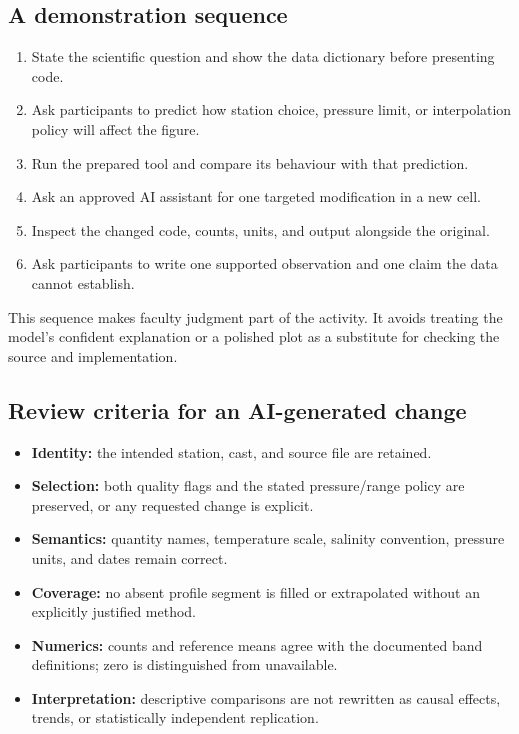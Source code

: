 \documentclass[11pt,letterpaper]{article}
\begin{document}
\subsection{A demonstration sequence}
\begin{enumerate}
  \item State the scientific question and show the data dictionary before presenting code.
  \item Ask participants to predict how station choice, pressure limit, or interpolation policy will affect the figure.
  \item Run the prepared tool and compare its behaviour with that prediction.
  \item Ask an approved AI assistant for one targeted modification in a new cell.
  \item Inspect the changed code, counts, units, and output alongside the original.
  \item Ask participants to write one supported observation and one claim the data cannot establish.
\end{enumerate}
This sequence makes faculty judgment part of the activity. It avoids treating the model's confident explanation or a polished plot as a substitute for checking the source and implementation.

\subsection{Review criteria for an AI-generated change}
\begin{itemize}
  \item \textbf{Identity:} the intended station, cast, and source file are retained.
  \item \textbf{Selection:} both quality flags and the stated pressure/range policy are preserved, or any requested change is explicit.
  \item \textbf{Semantics:} quantity names, temperature scale, salinity convention, pressure units, and dates remain correct.
  \item \textbf{Coverage:} no absent profile segment is filled or extrapolated without an explicitly justified method.
  \item \textbf{Numerics:} counts and reference means agree with the documented band definitions; zero is distinguished from unavailable.
  \item \textbf{Interpretation:} descriptive comparisons are not rewritten as causal effects, trends, or statistically independent replication.
\end{itemize}
\end{document}
